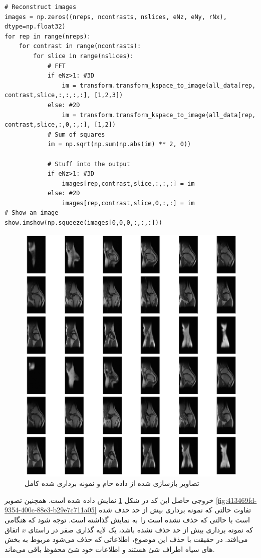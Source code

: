 \begin{latin}
\begin{lstlisting}
# Reconstruct images
images = np.zeros((nreps, ncontrasts, nslices, eNz, eNy, rNx), dtype=np.float32)
for rep in range(nreps):
	for contrast in range(ncontrasts):
		for slice in range(nslices):
			# FFT
			if eNz>1: #3D
				im = transform.transform_kspace_to_image(all_data[rep, contrast,slice,:,:,:,:], [1,2,3])
			else: #2D
				im = transform.transform_kspace_to_image(all_data[rep, contrast,slice,:,0,:,:], [1,2])
			# Sum of squares
			im = np.sqrt(np.sum(np.abs(im) ** 2, 0))
				
			# Stuff into the output
			if eNz>1: #3D
				images[rep,contrast,slice,:,:,:] = im
			else: #2D
				images[rep,contrast,slice,0,:,:] = im
# Show an image
show.imshow(np.squeeze(images[0,0,0,:,:,:]))
\end{lstlisting}
\end{latin}


\begin{figure}[t!]
	\centering
	\includegraphics[width=0.6\linewidth]{chapters/chapter-4/figs/result-36-plots-data-load}
	\caption{تصاویر بازسازی شده از داده خام و نمونه برداری شده کامل}
	\label{fig:result-36-plots-data-load}
\end{figure}

خروجی حاصل این کد در شکل \ref{fig:result-36-plots-data-load}
نمایش داده شده است.
همچنین تصویر \ref{fig:413469fd-9354-400c-88e3-b29e7c711a05}
تفاوت حالتی که نمونه برداری بیش از حد حذف شده است با حالتی که حذف نشده است را به نمایش گذاشته است. توجه شود که هنگامی که نمونه برداری بیش از حد حذف نشده باشد، یک لایه گذاری صفر
در راستای $x$ اتفاق می‌افتد. در حقیقت با حذف این موضوع، اطلاعاتی که حذف می‌شود مربوط به بخش های سیاه اطراف شئ هستند و اطلاعات خود شئ محفوظ باقی می‌ماند.

